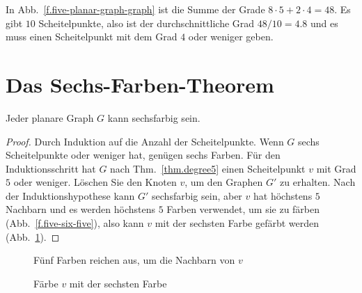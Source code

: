 \begin{example}
In Abb.~\ref{f.five-planar-graph-graph} ist die Summe der Grade $8\cdot 5 + 2\cdot 4=48$. Es gibt $10$ Scheitelpunkte, also ist der durchschnittliche Grad $48/10=4.8$ und es muss einen Scheitelpunkt mit dem Grad $4$ oder weniger geben.
\end{example}

\section{Das Sechs-Farben-Theorem}\label{s.six-color}

\begin{theorem}\label{thm.sixcolor}
Jeder planare Graph $G$ kann sechsfarbig sein.
\end{theorem}
\begin{proof}
Durch Induktion auf die Anzahl der Scheitelpunkte. Wenn $G$ sechs Scheitelpunkte oder weniger hat, genügen sechs Farben.
Für den Induktionsschritt hat $G$ nach Thm.~\ref{thm.degree5} einen Scheitelpunkt $v$ mit Grad $5$ oder weniger. Löschen Sie den Knoten $v$, um den Graphen $G'$ zu erhalten. Nach der Induktionshypothese kann $G'$ sechsfarbig sein, aber $v$ hat höchstens $5$ Nachbarn und es werden höchstens $5$ Farben verwendet, um sie zu färben (Abb.~\ref{f.five-six-five}), also kann $v$ mit der sechsten Farbe gefärbt werden (Abb.~\ref{f.five-six-six}).
\end{proof}

\begin{figure}[hbt]
\begin{minipage}{.45\textwidth}
\caption{Fünf Farben reichen aus, um die Nachbarn von $v$}\label{f.five-six-five}
\end{minipage}
\hfill
\begin{minipage}{.45\textwidth}
\caption{Färbe $v$ mit der sechsten Farbe}\label{f.five-six-six}
\end{minipage}
\end{figure}

